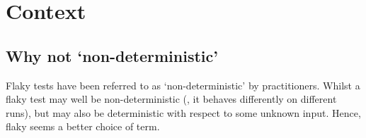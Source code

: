 \section{Context}
\label{sec:context}



\subsection{Why not {\lq}non-deterministic{\rq}}

Flaky tests have been referred to as {\lq}non-deterministic{\rq} by practitioners. Whilst a flaky test may well be non-deterministic (\ie, it behaves differently on different runs), but may also be deterministic with respect to some unknown input. Hence, flaky seems a better choice of term.



